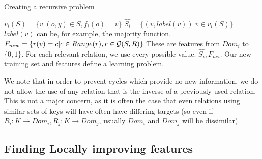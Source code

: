 \documentclass[twoside,11pt]{article}
\theoremstyle{definition}
\begin{document}
\begin{algorithm}[H]
	\caption{Creating a recursive problem}
	\label{code-creating-prob}
	\small
		\begin{algorithmic}
                \State $v_i(S) = \{v | (o,y) \in S, f_{i}(o)=v\}$
                \State $\hat{S_i} = \{ (v, label(v)) | v \in v_i(S) \}$ 
                \Comment $label(v)$ can be, for example, the majority function.
                \State $F_{new}=\{r(v)=c| c\in Range(r), r\in {\cal G}(S,\bar{R})\}$
                \State \Comment These are features from $Dom_{i}$ to $\{0,1\}$. For each relevant relation, we use every possible value.
                \Return $\hat{S_i}, F_{new}$ 
                \Comment Our new training set and features define a learning problem.
			\EndFunction
			
		\end{algorithmic}
	\end{algorithm}

We note that in order to prevent cycles which provide no new information, we do not allow the use of any relation that is the inverse of a previously used relation. This is not a major concern, as it is often the case that even relations using similar sets of keys will have often have differing targets (so even if $R_{i}:K\rightarrow Dom_{i}, R_{j}:K\rightarrow Dom_{j}$, usually $Dom_{i}$ and $Dom_{j}$ will be dissimilar).


\subsection{Finding Locally improving features} \label{tree_usage}
\end{document}
